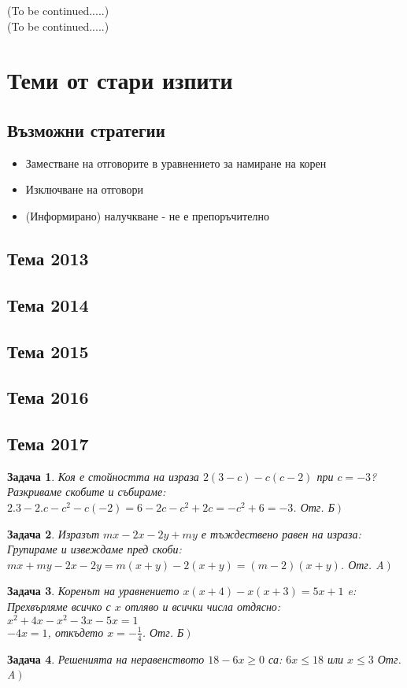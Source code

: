 \documentclass{article}
\theoremstyle{plain}
\newtheorem*{problem*}{Задача}
\begin{document}
\noindent
(To be continued.....)\\
(To be continued.....)




\section{Теми от стари изпити}
\subsection{Възможни стратегии}
\begin{itemize}
	\item Заместване на отговорите в уравнението за намиране на корен
	\item Изключване на отговори
	\item (Информирано) налучкване - не е препоръчително
\end{itemize}
\subsection{Тема 2013}
\subsection{Тема 2014}
\subsection{Тема 2015}
\subsection{Тема 2016}
\subsection{Тема 2017}
\begin{problem*}
	Коя е стойността на израза $2(3-c)-c(c-2) $ при $c=-3$?\\
	Разкриваме скобите и събираме: $2.3 -2.c -c^2 -c(-2) = 6-2c - c^2 + 2c = -c^2 + 6 = -3$. Отг. Б$\left. \right)$
\end{problem*}
	\begin{problem*}
	Изразът $mx-2x -2y + my$ е тъждествено равен на израза:\\
	Групираме и извеждаме пред скоби: $mx+my -2x -2y = m(x+y)-2(x+y) = (m-2)(x+y) $. Отг. A$\left. \right)$ 
\end{problem*}
\begin{problem*}
	Коренът на уравнението $x(x+4)-x(x+3) = 5x + 1$ e:\\
	Прехвърляме всичко с $x$ отляво и всички числа отдясно:\\
	$x^2 +4x - x^2 -3x -5x = 1 $\\
	$-4x = 1 $, откъдето $x = -\frac{1}{4} $. Отг. Б$\left. \right)$ 
\end{problem*}
\begin{problem*}
	Решенията на неравенството $18 -6x \geq 0$ са: 
	$6x \leq 18 $ или $ x \leq 3 $
	Отг. A$\left. \right)$ 
\end{problem*}
\end{document}
